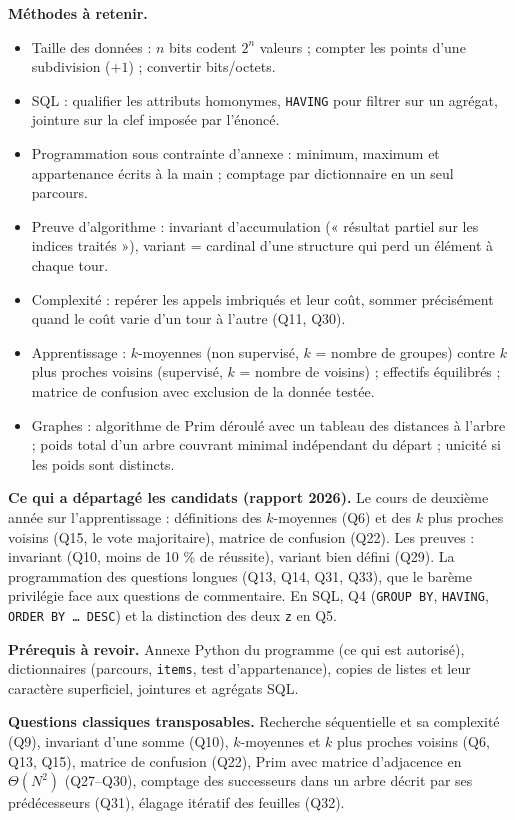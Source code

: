 \documentclass[11pt,a4paper]{article}
\providecommand{\tightlist}{\setlength{\itemsep}{0pt}\setlength{\parskip}{0pt}}
\begin{document}
\textbf{Méthodes à retenir.}

\begin{itemize}
\tightlist
\item
  Taille des données : \(n\) bits codent \(2^n\) valeurs ; compter les points d'une subdivision (\(+1\)) ; convertir bits/octets.
\item
  SQL : qualifier les attributs homonymes, \texttt{HAVING} pour filtrer sur un agrégat, jointure sur la clef imposée par l'énoncé.
\item
  Programmation sous contrainte d'annexe : minimum, maximum et appartenance écrits à la main ; comptage par dictionnaire en un seul parcours.
\item
  Preuve d'algorithme : invariant d'accumulation (« résultat partiel sur les indices traités »), variant = cardinal d'une structure qui perd un élément à chaque tour.
\item
  Complexité : repérer les appels imbriqués et leur coût, sommer précisément quand le coût varie d'un tour à l'autre (Q11, Q30).
\item
  Apprentissage : \(k\)-moyennes (non supervisé, \(k\) = nombre de groupes) contre \(k\) plus proches voisins (supervisé, \(k\) = nombre de voisins) ; effectifs équilibrés ; matrice de confusion avec exclusion de la donnée testée.
\item
  Graphes : algorithme de Prim déroulé avec un tableau des distances à l'arbre ; poids total d'un arbre couvrant minimal indépendant du départ ; unicité si les poids sont distincts.
\end{itemize}

\textbf{Ce qui a départagé les candidats (rapport 2026).} Le cours de deuxième année sur l'apprentissage : définitions des \(k\)-moyennes (Q6) et des \(k\) plus proches voisins (Q15, le vote majoritaire), matrice de confusion (Q22). Les preuves : invariant (Q10, moins de 10 \% de réussite), variant bien défini (Q29). La programmation des questions longues (Q13, Q14, Q31, Q33), que le barème privilégie face aux questions de commentaire. En SQL, Q4 (\texttt{GROUP\ BY}, \texttt{HAVING}, \texttt{ORDER\ BY\ …\ DESC}) et la distinction des deux \texttt{z} en Q5.

\textbf{Prérequis à revoir.} Annexe Python du programme (ce qui est autorisé), dictionnaires (parcours, \texttt{items}, test d'appartenance), copies de listes et leur caractère superficiel, jointures et agrégats SQL.

\textbf{Questions classiques transposables.} Recherche séquentielle et sa complexité (Q9), invariant d'une somme (Q10), \(k\)-moyennes et \(k\) plus proches voisins (Q6, Q13, Q15), matrice de confusion (Q22), Prim avec matrice d'adjacence en \(\Theta(N^2)\) (Q27--Q30), comptage des successeurs dans un arbre décrit par ses prédécesseurs (Q31), élagage itératif des feuilles (Q32).
\end{document}
